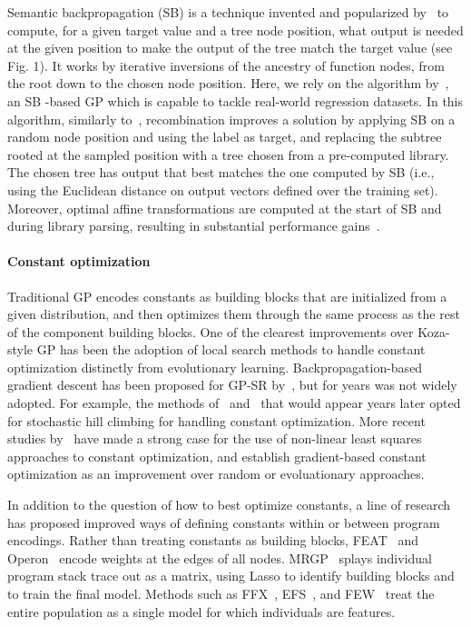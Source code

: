 Semantic backpropagation (SB) is a technique invented and popularized by~\cite{wieloch2013running,krawiec2013approximating,pawlak2014semantic} to compute, for a given target value and a tree node position, what output is needed at the given position to make the output of the tree match the target value (see Fig. 1). It works by iterative inversions of the ancestry of function nodes, from the root down to the chosen node position. Here, we rely on the algorithm by~\cite{virgolin2019linear}, an SB -based GP which is capable to tackle real-world regression datasets. In this algorithm, similarly to~\cite{wieloch2013running}, recombination improves a solution by applying SB on a random node position and using the label as target, and replacing the subtree rooted at the sampled position with a tree chosen from a pre-computed library. The chosen tree has output that best matches the one computed by SB (i.e., using the Euclidean distance on output vectors defined over the training set). Moreover, optimal affine transformations are computed at the start of SB and during library parsing, resulting in substantial performance gains~\cite{virgolin2019linear}.

\paragraph{Constant optimization}
Traditional GP encodes constants as building blocks that are initialized from a given distribution, and then optimizes them through the same process as the rest of the component building blocks.
One of the clearest improvements over Koza-style GP has been the adoption of local search methods to handle constant optimization distinctly from evolutionary learning. 
Backpropagation-based gradient descent has been proposed for GP-SR by~\citet{topchyFasterGeneticProgramming2001}, but for years was not widely adopted. 
For example, the methods of~\citet{bongardNonlinearSystemIdentification2005a} and~\citet{schmidtDistillingFreeformNatural2009} that would appear years later opted for stochastic hill climbing for handling constant optimization. 
More recent studies by~\cite{kommenda_effects_2013,kommendaParameterIdentificationSymbolic2019} have made a strong case for the use of non-linear least squares approaches to constant optimization, and establish gradient-based constant optimization as an improvement over random or evoluationary approaches.

In addition to the question of how to best optimize constants, a line of research has proposed improved ways of defining constants within or between program encodings. 
Rather than treating constants as building blocks, FEAT~\cite{lacavaLearningConciseRepresentations2019c} and Operon~\cite{burlacuOperonEfficientGenetic2020} encode weights at the edges of all nodes. 
MRGP~\cite{arnaldoMultipleRegressionGenetic2014a} splays individual program stack trace out as a matrix, using Lasso to identify building blocks and to train the final model.
Methods such as FFX~\cite{mcconaghyFFXFastScalable2011}, EFS~\cite{arnaldoBuildingPredictiveModels2015}, and FEW~\cite{lacavaGeneralFeatureEngineering2017} treat the entire population as a single model for which individuals are features.

